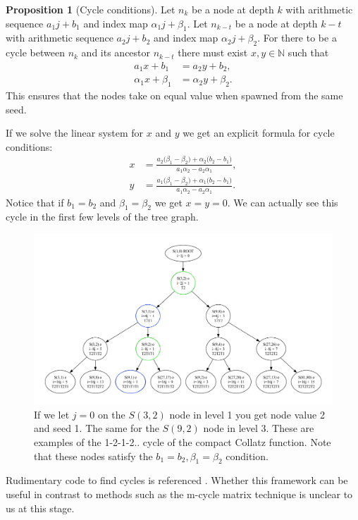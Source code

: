 \documentclass{article}
\theoremstyle{definition}
\newtheorem{proposition}{Proposition}[section]
\begin{document}
\begin{proposition}[Cycle conditions]\label{proposition:prop3}
Let $n_k$ be a node at depth $k$ with arithmetic sequence $a_1 j + b_1$ and index map $\alpha_1 j + \beta_1$. Let $n_{k-t}$ be a node at depth $k-t$ with arithmetic sequence $a_2 j + b_2$ and index map $\alpha_2 j + \beta_2$.  For there to be a cycle between $n_k$ and its ancestor $n_{k-t}$ there must exist $x,y\in\mathbb{N}$ such that
\begin{equation*}
    \begin{split}
        a_1 x + b_1 & = a_2 y + b_2, \\
        \alpha_1 x + \beta_1 & = \alpha_2 y + \beta_2.
    \end{split}
\end{equation*}
This ensures that the nodes take on equal value when spawned from the same seed.
\end{proposition}
%
If we solve the linear system for $x$ and $y$ we get an explicit formula for cycle conditions:
\begin{equation*}
    \begin{split}
        x & = \frac{a_2\big(\beta_1 - \beta_2\big) + \alpha_2\big(b_2 - b_1\big)}{a_1\alpha_2 - a_2\alpha_1}, \\
        y & = \frac{a_1\big(\beta_1 - \beta_2\big) + \alpha_1\big(b_2 - b_1\big)}{a_1\alpha_2 - a_2\alpha_1}.
    \end{split}
\end{equation*}
Notice that if $b_1=b_2$ and $\beta_1=\beta_2$ we get $x=y=0$. We can actually see this cycle in the first few levels of the tree graph.
\begin{figure}[H]
\begin{center} 
\includegraphics[width=1.0\textwidth]{loop_illustration.pdf}
\caption{If we let $j=0$ on the $S(3,2)$ node in level 1 you get node value 2 and seed 1. The same for the $S(9,2)$ node in level 3. These are examples of the 1-2-1-2.. cycle of the compact Collatz function. Note that these nodes satisfy the $b_1=b_2,\beta_1=\beta_2$ condition.}
\label{fig:fig3}
\end{center}
\end{figure}
%
Rudimentary code to find cycles is referenced \cite{Angermund2025}. Whether this framework can be useful in contrast to methods such as the m-cycle matrix technique\cite{SimonsDeWeger2005} is unclear to us at this stage.
\end{document}

